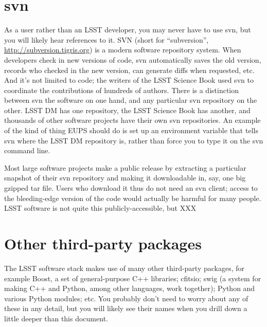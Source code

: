 \section{svn}

As a user rather than an LSST developer, you may never have to use
svn, but you will likely hear references to it.  SVN (short for
``subversion'', \url{http://subversion.tigris.org}) is a modern
software repository system.  When developers check in new versions of
code, svn automatically saves the old version, records who checked in
the new version, can generate diffs when requested, etc.  And it's not
limited to code; the writers of the LSST Science Book used svn to
coordinate the contributions of hundreds of authors.  There is a
distinction between svn the software on one hand, and any particular
svn repository on the other.  LSST DM has one repository, the LSST
Science Book has another, and thousands of other software projects
have their own svn repositories.  An example of the kind of thing EUPS
should do is set up an environment variable that tells svn where the
LSST DM repository is, rather than force you to type it on the svn
command line.

Most large software projects make a public release by extracting a
particular snapshot of their svn repository and making it downloadable
in, say, one big gzipped tar file.  Users who download it thus do not
need an svn client; access to the bleeding-edge version of the code
would actually be harmful for many people.  LSST software is not quite
this publicly-accessible, but XXX

\section{Other third-party packages}

The LSST software stack makes use of many other third-party packages,
for example Boost, a set of general-purpose C++ libraries; cfitsio;
swig (a system for making C++ and Python, among other languages, work
together); Python and various Python modules; etc.  You probably don't
need to worry about any of these in any detail, but you will likely
see their names when you drill down a little deeper than this
document.

